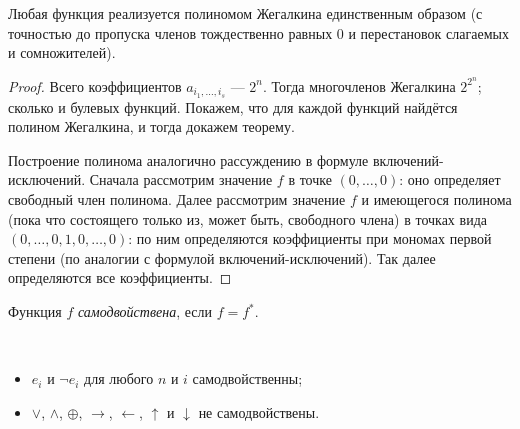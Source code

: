\documentclass[12pt,a4paper]{article}
\begin{document}
    \begin{theorem}[Жегалкин]
        Любая функция реализуется полиномом Жегалкина единственным образом (с точностью до пропуска членов тождественно равных 0 и перестановок слагаемых и сомножителей). 
    \end{theorem}

    \begin{proof}
        Всего коэффициентов $a_{i_1, \dots, i_s}$ --- $2^n$. Тогда многочленов Жегалкина $2^{2^n}$; сколько и булевых функций. Покажем, что для каждой функций найдётся полином Жегалкина, и тогда докажем теорему.

        Построение полинома аналогично рассуждению в формуле включений-исключений. Сначала рассмотрим значение $f$ в точке $(0, \dots, 0)$: оно определяет свободный член полинома. Далее рассмотрим значение $f$ и имеющегося полинома (пока что состоящего только из, может быть, свободного члена) в точках вида $(0, \dots, 0, 1, 0, \dots, 0)$: по ним определяются коэффициенты при мономах первой степени (по аналогии с формулой включений-исключений). Так далее определяются все коэффициенты.
    \end{proof}

    \begin{definition}
        Функция $f$ \emph{самодвойствена}, если $f=f^*$.
    \end{definition}

    \begin{example}\ 
        \begin{itemize}
            \item $e_i$ и $\neg e_i$ для любого $n$ и $i$ самодвойственны;
            \item $\vee$, $\wedge$, $\oplus$, $\rightarrow$, $\leftarrow$, $\uparrow$ и $\downarrow$ не самодвойствены.
        \end{itemize}
    \end{example}
\end{document}
